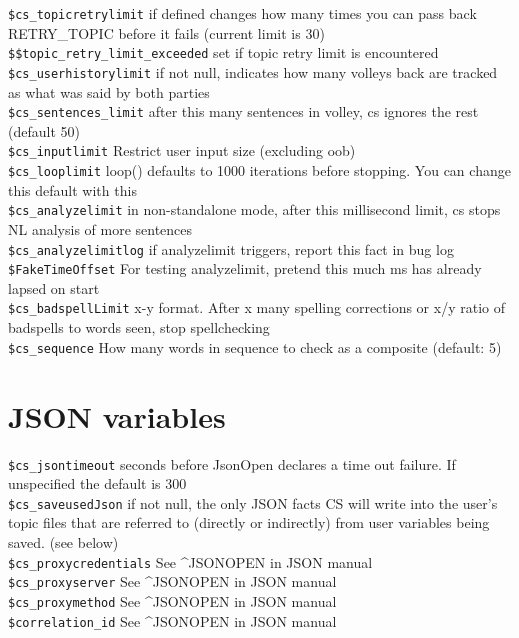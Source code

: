 \documentclass[]{article}
\begin{document}
\texttt{\$cs\_topicretrylimit} \textbar{} if defined changes how many
times you can pass back RETRY\_TOPIC before it fails (current limit is
30) \textbar{}\\
\texttt{\$\$topic\_retry\_limit\_exceeded} \textbar{} set if topic retry
limit is encountered \textbar{}\\
\texttt{\$cs\_userhistorylimit} \textbar{} if not null, indicates how
many volleys back are tracked as what was said by both parties
\textbar{}\\
\texttt{\$cs\_sentences\_limit} \textbar{} after this many sentences in
volley, cs ignores the rest (default 50) \textbar{}\\
\texttt{\$cs\_inputlimit} \textbar{} Restrict user input size (excluding
oob) \textbar{}\\
\texttt{\$cs\_looplimit} \textbar{} loop() defaults to 1000 iterations
before stopping. You can change this default with this \textbar{}\\
\texttt{\$cs\_analyzelimit} \textbar{} in non-standalone mode, after
this millisecond limit, cs stops NL analysis of more sentences
\textbar{}\\
\texttt{\$cs\_analyzelimitlog} \textbar{} if analyzelimit triggers,
report this fact in bug log \textbar{}\\
\texttt{\$FakeTimeOffset} \textbar{} For testing analyzelimit, pretend
this much ms has already lapsed on start \textbar{}\\
\texttt{\$cs\_badspellLimit} \textbar{} x-y format. After x many
spelling corrections or x/y ratio of badspells to words seen, stop
spellchecking \textbar{}\\
\texttt{\$cs\_sequence} \textbar{} How many words in sequence to check
as a composite (default: 5) \textbar{}

\section{JSON variables}\label{json-variables}

\texttt{\$cs\_jsontimeout} \textbar{} seconds before JsonOpen declares a
time out failure. If unspecified the default is 300 \textbar{}\\
\texttt{\$cs\_saveusedJson} \textbar{} if not null, the only JSON facts
CS will write into the user's topic files that are referred to (directly
or indirectly) from user variables being saved. (see below) \textbar{}\\
\texttt{\$cs\_proxycredentials} \textbar{} See \^{}JSONOPEN in JSON
manual\textbar{}\\
\texttt{\$cs\_proxyserver} \textbar{} See \^{}JSONOPEN in JSON
manual\textbar{}\\
\texttt{\$cs\_proxymethod} \textbar{} See \^{}JSONOPEN in JSON
manual\textbar{}\\
\texttt{\$correlation\_id} \textbar{} See \^{}JSONOPEN in JSON
manual\textbar{}
\end{document}
